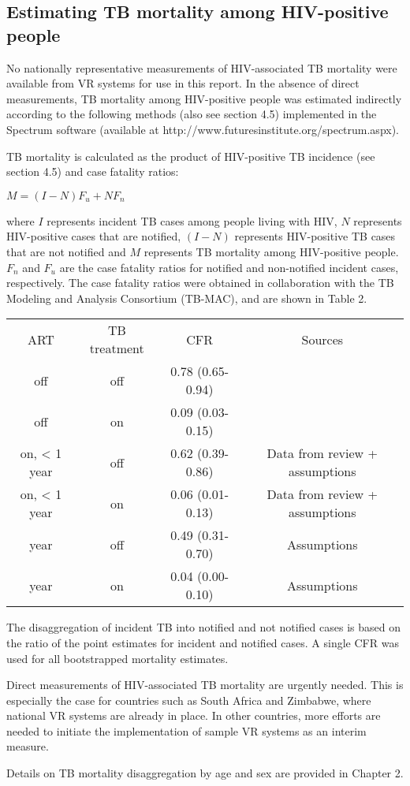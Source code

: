 \subsection{Estimating TB mortality among HIV-positive people}

No nationally representative measurements of HIV-associated TB mortality were available from VR systems for use in this report. In the absence of direct measurements, TB mortality among HIV-positive people was estimated indirectly according to the following methods (also see section 4.5) implemented in the Spectrum software (available at http://www.futuresinstitute.org/spectrum.aspx).

TB mortality is calculated as the product of HIV-positive TB incidence (see section 4.5) and case fatality ratios:

$M = (I-N)F_u + NF_n$ 									

where $I$ represents incident TB cases among people living with HIV, $N$ represents HIV-positive cases that are notified, $(I-N)$ represents HIV-positive TB cases that are not notified and $M$ represents TB mortality among HIV-positive people. $F_n$ and $F_u$ are the case fatality ratios for notified and non-notified incident cases, respectively. The case fatality ratios were obtained in collaboration with the TB Modeling and Analysis Consortium (TB-MAC), and are shown in Table 2.

\begin{table} 
    \begin{tabular}{ c c c c }
        ART  & TB treatment & CFR & Sources \\ 
        off          & off  & 0.78 (0.65-0.94) &  \cite{12742798} \\ 
        off          & on   & 0.09 (0.03-0.15) & \cite{21738585} \cite{11216921}\\ 
        on, < 1 year & off  & 0.62 (0.39-0.86) & Data from review + assumptions \\ 
        on, < 1 year & on   & 0.06 (0.01-0.13) & Data from review + assumptions \\ 
        \geq 1 year  & off  & 0.49 (0.31-0.70) & Assumptions \\ 
        \geq 1 year  & on   & 0.04 (0.00-0.10) & Assumptions \\ 
    \end{tabular} 
\end{table}

The disaggregation of incident TB into notified and not notified cases is based on the ratio of the point estimates for incident and notified cases. A single CFR was used for all bootstrapped mortality estimates.

Direct measurements of HIV-associated TB mortality are urgently needed. This is especially the case for countries such as South Africa and Zimbabwe, where national VR systems are already in place. In other countries, more efforts are needed to initiate the implementation of sample VR systems as an interim measure.

Details on TB mortality disaggregation by age and sex are provided in Chapter 2.
